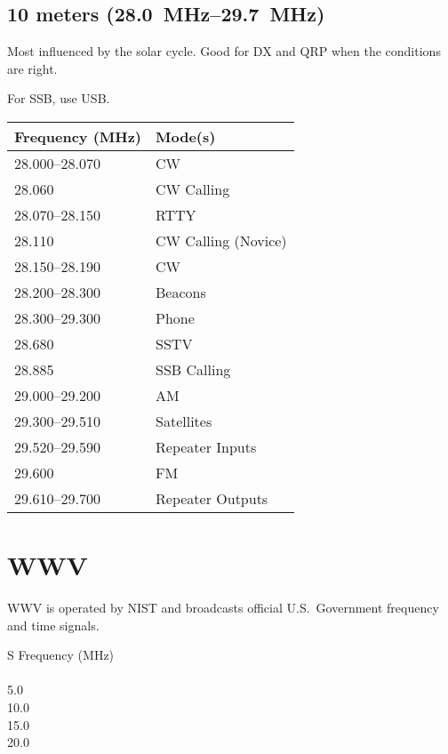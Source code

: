 \documentclass[11pt, twocolumn]{article}
\begin{document}
\subsection{10 meters (\SIrange{28.0}{29.7}{\MHz})}
Most influenced by the solar cycle. Good for DX and QRP when
the conditions are right.

For SSB, use USB.
\begin{center}
  \begin{tabular}{l l}
    {Frequency (\si{\MHz})}			&	Mode(s)				\\
    \midrule
    \numrange{28.000}{28.070}		&	CW					\\
    \num{28.060}					&	CW Calling			\\
    \numrange{28.070}{28.150}		&	RTTY				\\
    \num{28.110}					&	CW Calling (Novice)	\\
    \numrange{28.150}{28.190}		&	CW					\\
    \numrange{28.200}{28.300}		&	Beacons				\\
    \numrange{28.300}{29.300}		&	Phone				\\
    \num{28.680}					&	SSTV				\\
    \num{28.885}					&	SSB Calling			\\
    \numrange{29.000}{29.200}		&	AM					\\
    \numrange{29.300}{29.510}		&	Satellites			\\
    \numrange{29.520}{29.590}		&	Repeater Inputs		\\
    \num{29.600}					&	FM					\\
    \numrange{29.610}{29.700}		&	Repeater Outputs	\\
  \end{tabular}
\end{center}






\section{WWV}
WWV is operated by NIST and broadcasts official U.S.\ Government frequency and time signals.
\begin{center}
  \begin{tabular}{S}
    {Frequency (\si{\MHz})} \\
    	\\
    5.0	\\
    10.0	\\
    15.0	\\
    20.0	\\
  \end{tabular}
\end{center}
\end{document}
